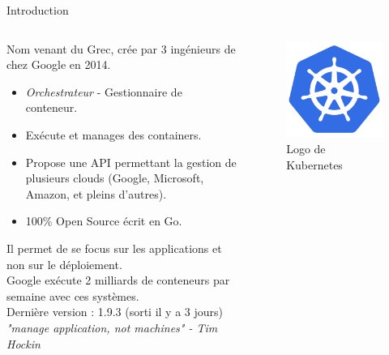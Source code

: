 \documentclass{bredelebeamer}
\begin{document}
\begin{frame}{Introduction}
\begin{columns}
\begin{column}{0.5\textwidth}

Nom venant du Grec, crée par 3 ingénieurs de chez Google en 2014.
\begin{itemize}
\item \textit{Orchestrateur} - Gestionnaire de conteneur.
\item Exécute et manages des containers.
\item Propose une API permettant la gestion de plusieurs clouds (Google, Microsoft, Amazon, et pleins d'autres).
\item 100\% Open Source écrit en Go.
\end{itemize}
\vspace{10px}
Il permet de se focus sur les applications et non sur le déploiement.  \\
Google exécute 2 milliards de conteneurs par semaine avec ces systèmes.\\
Dernière version : 1.9.3 (sorti il y a 3 jours) \\ 

\vspace{10px}
\textit{"manage application, not machines" - Tim Hockin}

\end{column}
\begin{column}{0.5\textwidth}
\begin{figure}
\centering
\includegraphics[scale=0.15]{images/img1.png}
\caption{Logo de Kubernetes}
\end{figure}
\end{column}
\end{columns}
\end{frame}
\end{document}

